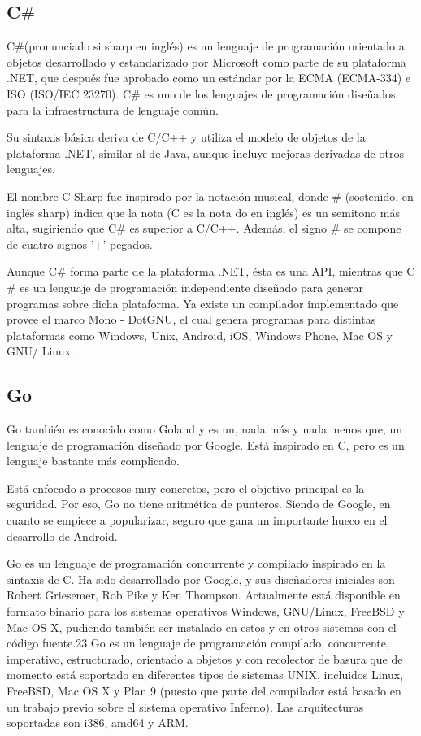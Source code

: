 \documentclass[twoside,twocolumn]{article}
\begin{document}
\subsection{C$\#$}

C$\#$(pronunciado si sharp en inglés) es un lenguaje de programación orientado a objetos desarrollado y estandarizado por Microsoft como parte de su plataforma .NET, que después fue aprobado como un estándar por la ECMA (ECMA-334) e ISO (ISO/IEC 23270). C$\#$ es uno de los lenguajes de programación diseñados para la infraestructura de lenguaje común.

Su sintaxis básica deriva de C/C++ y utiliza el modelo de objetos de la plataforma .NET, similar al de Java, aunque incluye mejoras derivadas de otros lenguajes.

El nombre C Sharp fue inspirado por la notación musical, donde $\#$ (sostenido, en inglés sharp) indica que la nota (C es la nota do en inglés) es un semitono más alta, sugiriendo que C$\#$ es superior a C/C++. Además, el signo $\#$ se compone de cuatro signos '+' pegados.

Aunque C$\#$ forma parte de la plataforma .NET, ésta es una API, mientras que C$\#$ es un lenguaje de programación independiente diseñado para generar programas sobre dicha plataforma. Ya existe un compilador implementado que provee el marco Mono - DotGNU, el cual genera programas para distintas plataformas como Windows, Unix, Android, iOS, Windows Phone, Mac OS y GNU/
Linux.

\subsection{Go}

Go también es conocido como Goland y es un, nada más y nada menos que, un lenguaje de programación diseñado por Google. Está inspirado en C, pero es un lenguaje bastante más complicado.

Está enfocado a procesos muy concretos, pero el objetivo principal es la seguridad. Por eso, Go no tiene aritmética de punteros. Siendo de Google, en cuanto se empiece a popularizar, seguro que gana un importante hueco en el desarrollo de Android.

Go es un lenguaje de programación concurrente y compilado inspirado en la sintaxis de C. Ha sido desarrollado por Google, y sus diseñadores iniciales son Robert Griesemer, Rob Pike y Ken Thompson. Actualmente está disponible en formato binario para los sistemas operativos Windows, GNU/Linux, FreeBSD y Mac OS X, pudiendo también ser instalado en estos y en otros sistemas con el código fuente.2​3​ Go es un lenguaje de programación compilado, concurrente, imperativo, estructurado, orientado a objetos y con recolector de basura que de momento está soportado en diferentes tipos de sistemas UNIX, incluidos Linux, FreeBSD, Mac OS X y Plan 9 (puesto que parte del compilador está basado en un trabajo previo sobre el sistema operativo Inferno). Las arquitecturas soportadas son i386, amd64 y ARM. 
\end{document}
